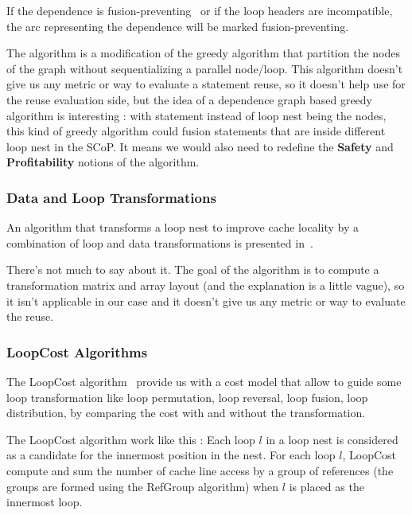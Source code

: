 \documentclass[paper=a4, fontsize=11pt]{scrartcl}
\numberwithin{equation}{section}        %
\numberwithin{figure}{section}          %
\numberwithin{table}{section}               %
\begin{document}
            If the dependence is fusion-preventing~\cite{Bacon:1994:CTH:197405.197406} or if the loop headers are incompatible,
            the arc representing the dependence will be marked fusion-preventing.

            The algorithm is a modification of the greedy algorithm that partition
            the nodes of the graph without sequentializing a parallel node/loop.
            This algorithm doesn't give us any metric or way to evaluate a statement
            reuse, so it doesn't help use for the reuse evaluation side, but the idea
            of a dependence graph based greedy algorithm is interesting : with statement
            instead of loop nest being the nodes, this kind of greedy algorithm 
            could fusion statements that are inside different loop nest in the SCoP.
            It means we would also need to redefine the \textbf{Safety} and \textbf{Profitability}
            notions of the algorithm.

        \subsubsection{Data and Loop Transformations}
            An algorithm that transforms a loop nest to improve cache locality
            by a combination of loop and data transformations is presented in~\cite{Kandemir99improvingcache}.

            There's not much to say about it. The goal of the algorithm is to
            compute a transformation matrix and array layout (and the explanation is a little
            vague), so it isn't applicable in our case and it doesn't give us any metric or way to evaluate the reuse.
        
        \subsubsection{LoopCost Algorithms}
            The LoopCost algorithm~\cite{McKinley:1996:IDL:233561.233564} provide
            us with a cost model that allow to guide some loop transformation like
            loop permutation, loop reversal, loop fusion, loop distribution,
            by comparing the cost with and without the transformation.
            
            The LoopCost algorithm work like this : 
            Each loop $l$ in a loop nest is considered as a candidate for the innermost
            position in the nest. For each loop $l$, LoopCost compute and sum the number
            of cache line access by a group of references (the groups are formed
            using the RefGroup algorithm) when $l$ is placed as the innermost loop.
\end{document}
